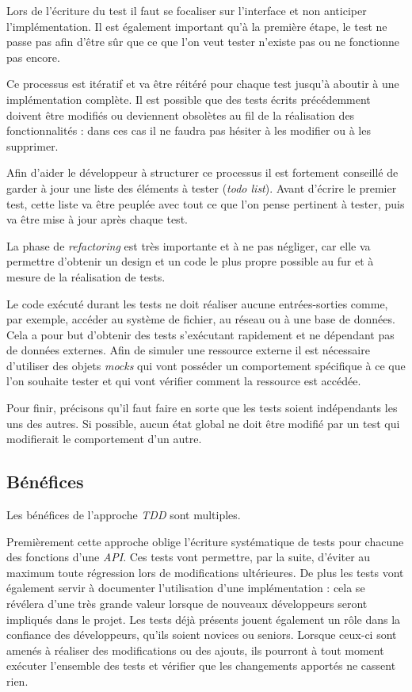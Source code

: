 \documentclass[journal, a4paper, frenchb]{IEEEtran}
\begin{document}
Lors de l'écriture du test il faut se focaliser sur l'interface et non anticiper l'implémentation. Il est également important qu'à la première étape, le test ne passe pas afin d'être sûr que ce que l'on veut tester n'existe pas ou ne fonctionne pas encore.

Ce processus est itératif et va être réitéré pour chaque test jusqu'à aboutir à une implémentation complète. Il est possible que des tests écrits précédemment doivent être modifiés ou deviennent obsolètes au fil de la réalisation des fonctionnalités : dans ces cas il ne faudra pas hésiter à les modifier ou à les supprimer.

Afin d'aider le développeur à structurer ce processus il est fortement conseillé de garder à jour une liste des éléments à tester (\emph{todo list}). Avant d'écrire le premier test, cette liste va être peuplée avec tout ce que l'on pense pertinent à tester, puis va être mise à jour après chaque test.

La phase de \emph{refactoring} est très importante et à ne pas négliger, car elle va permettre d'obtenir un design et un code le plus propre possible au fur et à mesure de la réalisation de tests.

Le code exécuté durant les tests ne doit réaliser aucune entrées-sorties comme, par exemple, accéder au système de fichier, au réseau ou à une base de données. Cela a pour but d'obtenir des tests s'exécutant rapidement et ne dépendant pas de données externes. Afin de simuler une ressource externe il est nécessaire d'utiliser des objets \emph{mocks} qui vont posséder un comportement spécifique à ce que l'on souhaite tester et qui vont vérifier comment la ressource est accédée.

Pour finir, précisons qu'il faut faire en sorte que les tests soient indépendants les uns des autres. Si possible, aucun état global ne doit être modifié par un test qui modifierait le comportement d'un autre.


\subsection{Bénéfices}

Les bénéfices de l'approche \emph{TDD} sont multiples. 

Premièrement cette approche oblige l'écriture systématique de tests pour chacune des fonctions d'une \emph{API}. Ces tests vont permettre, par la suite, d'éviter au maximum toute régression lors de modifications ultérieures. De plus les tests vont également servir à documenter l'utilisation d'une implémentation : cela se révélera d'une très grande valeur lorsque de nouveaux développeurs seront impliqués dans le projet. Les tests déjà présents jouent également un rôle dans la confiance des développeurs, qu'ils soient novices ou seniors. Lorsque ceux-ci sont amenés à réaliser des modifications ou des ajouts, ils pourront à tout moment exécuter l'ensemble des tests et vérifier que les changements apportés ne cassent rien.
\end{document}
